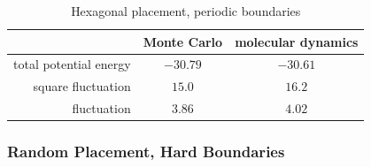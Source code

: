 \documentclass[UTF8,a4paper]{article}
\begin{document}
\begin{table}[H]
	\centering
	\caption{Hexagonal placement, periodic boundaries}
	\begin{tabular}{rcc}
		\toprule
		\toprule
		                       & Monte Carlo & molecular dynamics \\ \midrule
		total potential energy & $-30.79$    & $-30.61$           \\
		square fluctuation     & $15.0$      & $16.2$             \\
		fluctuation            & $3.86$      & $4.02$             \\
		\bottomrule
	\end{tabular}%
	\label{tab:hex_md_1}%
\end{table}%

\subsubsection{Random Placement, Hard Boundaries}
\end{document}
